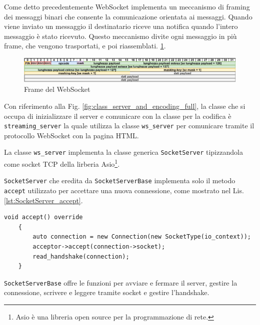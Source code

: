 Come detto precedentemente WebSocket implementa un meccanismo di framing dei messaggi binari che consente la comunicazione orientata ai messaggi. Quando viene inviato un messaggio il destinatario riceve una notifica quando l'intero messaggio è stato ricevuto. Questo meccanismo divite ogni messaggio in più frame, che vengono trasportati, e poi riassemblati. \ref{fig:dataframe_websocket}.

\begin{figure}[H]
	\includegraphics[width=\linewidth]{immagini/dataframe_websocket}
	\caption{Frame del WebSocket}
	\label{fig:dataframe_websocket}
\end{figure}

Con riferimento alla Fig. \ref{fig:class_server_and_encoding_full}, la classe che si occupa di inizializzare il server e comunicare con la classe per la codifica è \verb|streaming_server| la quale utilizza la classe \verb|ws_server| per comunicare tramite il protocollo WebSocket con la pagina HTML.

La classe \verb|ws_server| implementa la classe generica \verb|SocketServer| tipizzandola come socket TCP della lirberia Asio\footnote{Asio è una libreria open source per la programmazione di rete.}.

\verb|SocketServer| che eredita da \verb|SocketServerBase| implementa solo il metodo \verb|accept| utilizzato per accettare una nuova connessione, come mostrato nel Lis. \ref{lst:SocketServer_accept}.

\begin{lstlisting}[caption=Funzione accept della classe SocketServer, label={lst:SocketServer_accept}]
	void accept() override
	{
		auto connection = new Connection(new SocketType(io_context));
		acceptor->accept(connection->socket);
		read_handshake(connection);
	}
\end{lstlisting}

\verb|SocketServerBase| offre le funzioni per avviare e fermare il server, gestire la connessione, scrivere e leggere tramite socket e gestire l'handshake.

